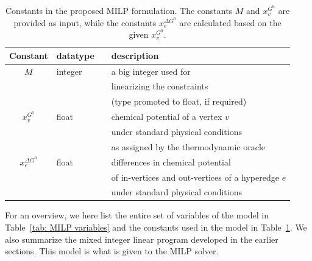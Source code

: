 \begin{table}[!b]
    \centering
    \begin{footnotesize}
    \begin{tabular}{clll}
        \toprule
        Constant & datatype & & description \\
        \midrule
        $M$ & integer & & a big integer used for \\
        &&& linearizing the constraints \\
        & & & (type promoted to float, if required) \\
        $x^{G^0}_v$ & float & & chemical potential of a vertex $v$ \\
        &&& under standard physical conditions \\
        & & & as assigned by the thermodynamic oracle \\
        $x^{\Delta G^0}_e$ & float & & differences in chemical potential \\
        &&& of in-vertices and out-vertices of a hyperedge $e$ \\
        & & & under standard physical conditions \\
        \bottomrule
    \end{tabular}
    \end{footnotesize}
    \caption{Constants in the proposed MILP formulation.
    The constants $M$ and $x^{G^0}_v$ are provided as input,
    while the constants $x^{\Delta G^0}_e$ are calculated based on the given $x^{G^0}_v$.
    }
    \label{tab: MILP constants}
\end{table}%


For an overview, we here list the entire set of variables of the model in Table~\ref{tab: MILP variables} and the constants used in the model in Table~\ref{tab: MILP constants}. We also summarize the mixed integer linear program developed in the earlier sections.
This model is what is given to the MILP solver.

